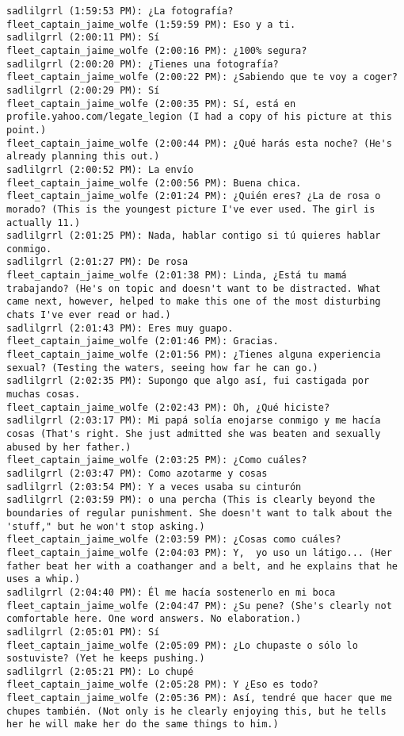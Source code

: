 \begin{verbatim}
sadlilgrrl (1:59:53 PM): ¿La fotografía?
fleet_captain_jaime_wolfe (1:59:59 PM): Eso y a ti.
sadlilgrrl (2:00:11 PM): Sí
fleet_captain_jaime_wolfe (2:00:16 PM): ¿100% segura?
sadlilgrrl (2:00:20 PM): ¿Tienes una fotografía?
fleet_captain_jaime_wolfe (2:00:22 PM): ¿Sabiendo que te voy a coger?
sadlilgrrl (2:00:29 PM): Sí
fleet_captain_jaime_wolfe (2:00:35 PM): Sí, está en profile.yahoo.com/legate_legion (I had a copy of his picture at this point.)
fleet_captain_jaime_wolfe (2:00:44 PM): ¿Qué harás esta noche? (He's already planning this out.)
sadlilgrrl (2:00:52 PM): La envío
fleet_captain_jaime_wolfe (2:00:56 PM): Buena chica.
fleet_captain_jaime_wolfe (2:01:24 PM): ¿Quién eres? ¿La de rosa o morado? (This is the youngest picture I've ever used. The girl is actually 11.)
sadlilgrrl (2:01:25 PM): Nada, hablar contigo si tú quieres hablar conmigo.
sadlilgrrl (2:01:27 PM): De rosa
fleet_captain_jaime_wolfe (2:01:38 PM): Linda, ¿Está tu mamá trabajando? (He's on topic and doesn't want to be distracted. What came next, however, helped to make this one of the most disturbing chats I've ever read or had.)
sadlilgrrl (2:01:43 PM): Eres muy guapo.
fleet_captain_jaime_wolfe (2:01:46 PM): Gracias.
fleet_captain_jaime_wolfe (2:01:56 PM): ¿Tienes alguna experiencia sexual? (Testing the waters, seeing how far he can go.)
sadlilgrrl (2:02:35 PM): Supongo que algo así, fui castigada por muchas cosas.
fleet_captain_jaime_wolfe (2:02:43 PM): Oh, ¿Qué hiciste?
sadlilgrrl (2:03:17 PM): Mi papá solía enojarse conmigo y me hacía cosas (That's right. She just admitted she was beaten and sexually abused by her father.)
fleet_captain_jaime_wolfe (2:03:25 PM): ¿Como cuáles?
sadlilgrrl (2:03:47 PM): Como azotarme y cosas
sadlilgrrl (2:03:54 PM): Y a veces usaba su cinturón
sadlilgrrl (2:03:59 PM): o una percha (This is clearly beyond the boundaries of regular punishment. She doesn't want to talk about the 'stuff," but he won't stop asking.)
fleet_captain_jaime_wolfe (2:03:59 PM): ¿Cosas como cuáles?
fleet_captain_jaime_wolfe (2:04:03 PM): Y,  yo uso un látigo... (Her father beat her with a coathanger and a belt, and he explains that he uses a whip.)
sadlilgrrl (2:04:40 PM): Él me hacía sostenerlo en mi boca
fleet_captain_jaime_wolfe (2:04:47 PM): ¿Su pene? (She's clearly not comfortable here. One word answers. No elaboration.)
sadlilgrrl (2:05:01 PM): Sí
fleet_captain_jaime_wolfe (2:05:09 PM): ¿Lo chupaste o sólo lo sostuviste? (Yet he keeps pushing.)
sadlilgrrl (2:05:21 PM): Lo chupé
fleet_captain_jaime_wolfe (2:05:28 PM): Y ¿Eso es todo?
fleet_captain_jaime_wolfe (2:05:36 PM): Así, tendré que hacer que me chupes también. (Not only is he clearly enjoying this, but he tells her he will make her do the same things to him.)

\end{verbatim}
